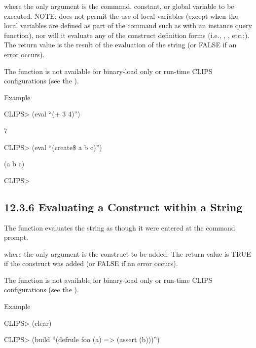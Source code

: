 \documentclass[letterpaper,10pt,english]{sphinxmanual}
\begin{document}
where the only argument is the command, constant, or global variable to
be executed. NOTE:  does not permit the use of local variables
(except when the local variables are defined as part of the command such
as with an instance query function), nor will it evaluate any of the
construct definition forms (i.e., , , etc.;). The
return value is the result of the evaluation of the string (or FALSE if
an error occurs).

The  function is not available for binary-load only or run-time
CLIPS configurations (see the ).

Example

CLIPS\textgreater{} (eval “(+ 3 4)”)

7

CLIPS\textgreater{} (eval “(create\$ a b c)”)

(a b c)

CLIPS\textgreater{}


\subsection{12.3.6 Evaluating a Construct within a String}
\label{\detokenize{actions:evaluating-a-construct-within-a-string}}
The  function evaluates the string as though it were entered at
the command prompt.


\begin{sphinxVerbatim}[commandchars=\\\{\}]
 
\end{sphinxVerbatim}

where the only argument is the construct to be added. The return value
is TRUE if the construct was added (or FALSE if an error occurs).

The  function is not available for binary-load only or run-time
CLIPS configurations (see the ).

Example

CLIPS\textgreater{} (clear)

CLIPS\textgreater{} (build “(defrule foo (a) =\textgreater{} (assert (b)))”)
\end{document}
